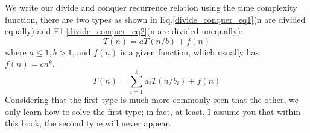 \documentclass[../main.tex]{subfiles}
\begin{document}
We write our divide and conquer recurrence relation using the time complexity function, there are two types as shown in Eq.\ref{divide_conquer_eq1}(n are divided equally) and E1.\ref{divide_conquer_eq2}(n are divided unequally):
\begin{equation}
    T(n)=aT(n/b)+f(n)
    \label{divide_conquer_eq1}
\end{equation}
where $a\leq 1, b>1$, and $f(n)$ is a given function, which usually has $f(n)= cn^k$.
\begin{equation}
    T(n)=\sum_{i=1}^{k}a_iT(n/b_i)+f(n)
    \label{divide_conquer_eq2}
\end{equation}
Considering that the first type is much more commonly seen that the other, we only learn how to solve the first type; in fact, at least, I assume you that within this book, the second type will never appear. 
\end{document}
